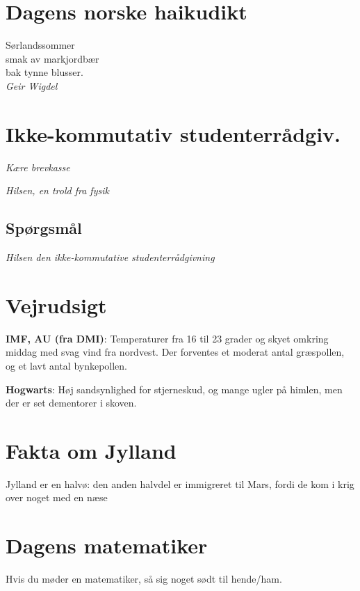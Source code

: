 

\begin{minipage}[b]{0.95\linewidth}
\begin{minipage}[t]{0.47\textwidth}
\vspace{1mm}
\section*{Dagens norske haikudikt}
\begin{center}
Sørlandssommer \\
smak av markjordbær \\
bak tynne blusser. \\
\emph{Geir Wigdel}
\end{center}
 
\section*{Ikke-kommutativ studenterrådgiv.}
\emph{Kære brevkasse}


\emph{Hilsen, en trold fra fysik}

\subsection*{Spørgsmål}


{\flushright\emph{Hilsen den ikke-kommutative studenterrådgivning}}

\end{minipage}%
\hfill\begin{minipage}[t]{0.47\textwidth}
\vspace{2mm}
\section*{Vejrudsigt}
\textbf{IMF, AU (fra DMI)}: Temperaturer fra 16 til 23 grader og skyet omkring middag med svag vind fra nordvest. Der forventes et moderat antal græspollen, og et lavt antal bynkepollen.

\textbf{Hogwarts}: Høj sandsynlighed for stjerneskud, og mange ugler på himlen, men der er set dementorer i skoven.

\section*{Fakta om Jylland}
Jylland er en halvø: den anden halvdel er immigreret til Mars, fordi de kom i krig over noget med en næse

\section*{Dagens matematiker}
Hvis du møder en matematiker, så sig noget sødt til hende/ham.


\end{minipage}
\end{minipage}
